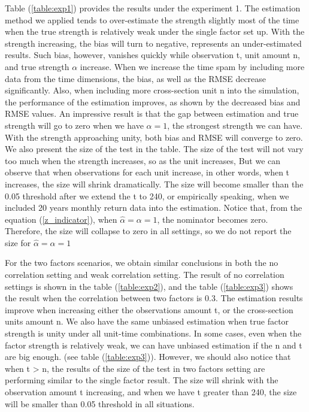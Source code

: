 Table (\ref{table:exp1}) provides the results under the experiment 1.
The estimation method we applied tends to over-estimate the strength slightly most of the time when the true strength is relatively weak under the single factor set up.
With the strength increasing, the bias will turn to negative, represents an under-estimated results.
Such bias, however, vanishes quickly while observation t, unit amount n, and true strength $\alpha$ increase.
When we increase the time spam by including more data from the time dimensions, the bias, as well as the RMSE decrease significantly.
Also, when including more cross-section unit n into the simulation, the performance of the estimation improves, as shown by the decreased bias and RMSE values.
An impressive result is that the gap between estimation and true strength will go to zero when we have $\alpha = 1$, the strongest strength we can have.
With the strength approaching unity, both bias and RMSE will converge to zero.
We also present the size of the test in the table.
The size of the test will not vary too much when the strength increases, so as the unit increases,
But we can observe that when observations for each unit increase, in other words, when t increases, the size will shrink dramatically.
The size will become smaller than the 0.05 threshold after we extend the t to 240, or empirically speaking, when we included 20 years monthly return data into the estimation.
Notice that, from the equation (\ref{z_indicator}), when $\hat{\alpha} = \alpha = 1$, the nominator becomes zero.
Therefore, the size will collapse to zero in all settings, so we do not report the size for $\hat{\alpha} = \alpha = 1$

For the two factors scenarios, we obtain similar conclusions in both the no correlation setting and weak correlation setting.
The result of no correlation settings is shown in the table (\ref{table:exp2}), and the table (\ref{table:exp3}) shows the result when the correlation between two factors is 0.3.
The estimation results improve when increasing either the observations amount t, or the cross-section units amount n.
We also have the same unbiased estimation when true factor strength is unity under all unit-time combinations.
In some cases, even when the factor strength is relatively weak, we can have unbiased estimation if the n and t are big enough. (see table (\ref{table:exp3})).
However, we should also notice that when t > n, the results of the size of the test in two factors setting are performing similar to the single factor result. 
The size will shrink with the observation amount t increasing, and when we have t greater than 240, the size will be smaller than 0.05 threshold in all situations.

